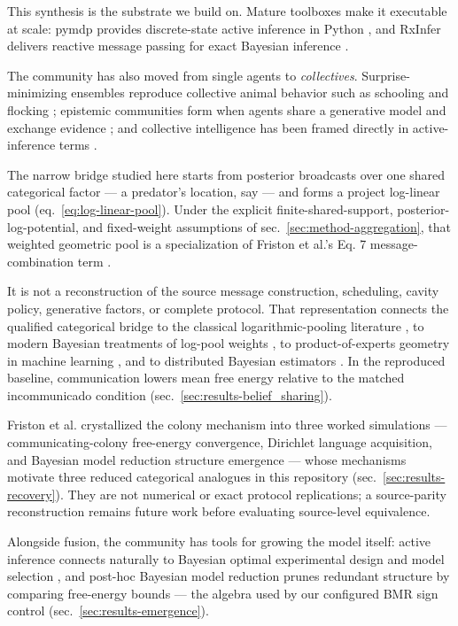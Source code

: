 \documentclass[
  english,
]{article}
\theoremstyle{plain}
\theoremstyle{definition}
\theoremstyle{remark}
\theoremstyle{definition}
\begin{document}
This synthesis is the substrate we build on. Mature toolboxes make it
executable at scale: pymdp provides discrete-state active inference in
Python \citep{heins2022pymdp}, and RxInfer delivers reactive message
passing for exact Bayesian inference \citep{bagaev2023rxinfer}.

The community has also moved from single agents to \emph{collectives}.
Surprise-minimizing ensembles reproduce collective animal behavior such
as schooling and flocking \citep{heins2023collective}; epistemic
communities form when agents share a generative model and exchange
evidence \citep{albarracin2022epistemic}; and collective intelligence
has been framed directly in active-inference terms
\citep{kaufmann2021collective}.

The narrow bridge studied here starts from posterior broadcasts over one
shared categorical factor --- a predator's location, say --- and forms a
project log-linear pool (eq.~\ref{eq:log-linear-pool}). Under the
explicit finite-shared-support, posterior-log-potential, and
fixed-weight assumptions of sec.~\ref{sec:method-aggregation}, that
weighted geometric pool is a specialization of Friston et al.'s Eq. 7
message-combination term \citep{friston2024federated}.

It is not a reconstruction of the source message construction,
scheduling, cavity policy, generative factors, or complete protocol.
That representation connects the qualified categorical bridge to the
classical logarithmic-pooling literature
\citep{genest1986combining, genest1986externally}, to modern Bayesian
treatments of log-pool weights \citep{carvalho2023logpooling}, to
product-of-experts geometry in machine learning
\citep{hinton2002products}, and to distributed Bayesian estimators
\citep{tresp2000bayesian}. In the reproduced baseline, communication
lowers mean free energy relative to the matched incommunicado condition
(sec.~\ref{sec:results-belief_sharing}).

Friston et al. \citeyearpar{friston2024federated} crystallized the
colony mechanism into three worked simulations --- communicating-colony
free-energy convergence, Dirichlet language acquisition, and Bayesian
model reduction structure emergence --- whose mechanisms motivate three
reduced categorical analogues in this repository
(sec.~\ref{sec:results-recovery}). They are not numerical or exact
protocol replications; a source-parity reconstruction remains future
work before evaluating source-level equivalence.

Alongside fusion, the community has tools for growing the model itself:
active inference connects naturally to Bayesian optimal experimental
design and model selection \citep{smith2020active}, and post-hoc
Bayesian model reduction prunes redundant structure by comparing
free-energy bounds \citep{friston2011post} --- the algebra used by our
configured BMR sign control (sec.~\ref{sec:results-emergence}).
\end{document}
